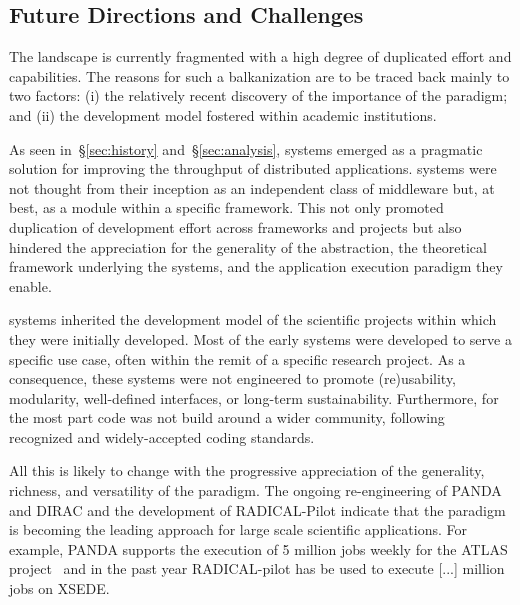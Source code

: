\documentclass{sig-alternate}
\begin{document}
%
\subsection{Future Directions and Challenges}
\label{sec:future}

The \pilot landscape is currently fragmented with a high degree of duplicated
effort and capabilities. The reasons for such a balkanization are to be traced
back mainly to two factors: (i) the relatively recent discovery of the
importance of the \pilot paradigm; and (ii) the development model fostered
within academic institutions.

As seen in~\S\ref{sec:history} and~\S\ref{sec:analysis}, \pilot systems emerged
as a pragmatic solution for improving the throughput of distributed
applications. \pilot systems were not thought from their inception as an
independent class of middleware but, at best, as a module within a specific
framework. This not only promoted duplication of development effort across
frameworks and projects but also hindered the appreciation for the generality of
the \pilot abstraction, the theoretical framework underlying the \pilot systems,
and the application execution paradigm they enable.

\pilot systems inherited the development model of the scientific projects
within which they were initially developed. Most of the early \pilot systems
were developed to serve a specific use case, often within the remit of a
specific research project. As a consequence, these systems were not engineered
to promote (re)usability, modularity, well-defined interfaces, or long-term
sustainability. Furthermore, for the most part code was not build around a
wider community, following recognized and widely-accepted coding standards.

All this is likely to change with the progressive appreciation of the
generality, richness, and versatility of the \pilot paradigm. The ongoing
re-engineering of PANDA and DIRAC and the development of RADICAL-Pilot indicate
that the \pilot paradigm is becoming the leading approach for large scale
scientific applications. For example, PANDA supports the execution of 5 million
jobs weekly for the ATLAS project~\cite{Aad2008} and in the past year
RADICAL-pilot has be used to execute [...] million jobs on XSEDE. 
\end{document}
